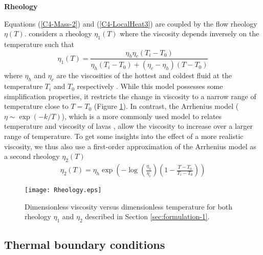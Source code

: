 \vspace{.5cm} \textbf{Rheology} \vspace{.5cm}

Equations (\ref{C4-Mass-2})  and (\ref{C4-LocalHeat3}) are  coupled by
the  flow  rheology   $\eta(T)$.   \citet{Thorey:2015vs}  considers  a
rheology  $\eta_1(T)$ where  the  viscosity depends  inversely on  the
temperature such that
\begin{equation}
  \eta_1(T)=\frac{\eta_h
    \eta_c(T_i-T_0)}{\eta_h(T_i-T_0)+(\eta_c-\eta_h)(T-T_0)}
  \label{rheology}
\end{equation}
where $\eta_h$  and $\eta_c$  are the viscosities  of the  hottest and
coldest  fluid  at  the   temperature  $T_i$  and  $T_0$  respectively
\citep{Bercovici:2007vc}.    While    this   model    possesses   some
simplification properties, it  restricts the change in  viscosity to a
narrow    range   of    temperature   close    to   $T=T_0$    (Figure
\ref{C4-Rheology}).     In     contrast,    the     Arrhenius    model
($\eta  \sim \exp(-k/T)$),  which is  a  more commonly  used model  to
relates  temperature and  viscosity  of lavas  \citep{Blatt:2ViMWPc0},
allow the  viscosity to increase  over a larger range  of temperature.
To get some insights into the effect of a more realistic viscosity, we
thus also use a first-order approximation  of the Arrhenius model as a
second rheology $\eta_2(T)$ \citep{Diniega:2013eh}
\begin{eqnarray}
  \eta_2(T) = \eta_h \exp\left(-\log\left(\frac{\eta_h}{\eta_c}\right)\left(1-\frac{T-T_0}{T_i-T_0}\right)\right)
\end{eqnarray}


\begin{figure}[htbp]
  \begin{center}
    \graphicspath{ {/Users/thorey/Documents/These/Projet/Refroidissement/Skin_Model/Figure/Figure_Heating/} }
    \texttt{[image: Rheology.eps]}
    \caption{Dimensionless viscosity  versus dimensionless temperature
      for  both rheology  $\eta_1$ and  $\eta_2$ described  in Section
      \ref{sec:formulation-1}.}
    \label{C4-Rheology}
  \end{center}
\end{figure}

\subsection{Thermal boundary conditions}
\label{C4-sec:thermal-boundary-condition}

